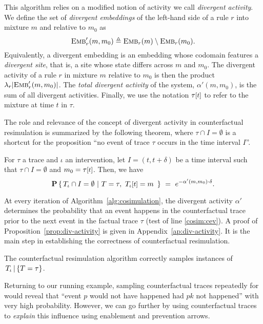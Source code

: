 This algorithm relies on a modified notion of activity we call
\emph{divergent activity}. We define the set of \emph{divergent
  embeddings} of the left-hand side of a rule $r$ into mixture $m$
and relative to $m_0$ as
\[{\textsc{Emb}}'_{r}(m, m_0) \triangleq {\textsc{Emb}}_{r}(m) \setminus {\textsc{Emb}}_{r}(m_0).\]
Equivalently, a divergent embedding is an embedding whose codomain
features a \emph{divergent site}, that is, a site whose state differs
across $m$ and $m_0$. The {divergent activity} of a rule $r$ in
mixture $m$ relative to $m_0$ is then the product
$\lambda_r|{\textsc{Emb}}'_{r}(m, m_0)|$. The \emph{total divergent activity} of
the system, $\alpha'(m, m_0)$, is the sum of all divergent
activities. Finally, we use the notation $\TSTATE{t}{\tau}$ to refer
to the mixture at time $t$ in $\tau$.



The role and relevance of the concept of divergent activity in
counterfactual resimulation is summarized by the
following theorem, where $\tau \cap I = \emptyset$ is a
shortcut for the proposition ``no event of trace $\tau$ occurs in
the time interval $I$''.
\begin{proposition}\label{prop:div-activity}
  For $\tau$ a trace
  and $\iota$ an intervention, let $I = (t, t+\delta)$ be a time interval
  such that $\tau \cap I = \emptyset$ and $m_0 =
  \TSTATE{t}{\tau}$. Then, we have
  \[\CProb{ \ATRAJ{} \cap I = \emptyset }{ T=\tau,\
      \TSTATE{t}{\ATRAJ{}} = m\ }
    \ =\ e^{-\alpha'(m, m_0) \cdot \delta}.
  \]
\end{proposition}
\noindent At every iteration of Algorithm~\ref{alg:cosimulation}, the
divergent activity $\alpha'$ determines the probability that an event
happens in the counterfactual trace prior to the next event in the
factual trace $\tau$ (test of line \ref{cosim:cev}).  A proof of
Proposition~\ref{prop:div-activity} is given in
Appendix~\ref{ap:div-activity}. It is the main step
in establishing the correctness of counterfactual resimulation.

\begin{theorem}%
  The counterfactual resimulation algorithm correctly
  samples instances of $\,{T_\iota\,|\,\{T=\tau\}}{}$.
\end{theorem}

Returning to our running example, sampling counterfactual traces
repeatedly for \RefTrace{} would reveal that ``event $p$ would not
have happened had $pk$ not happened'' with very high probability.
However, we can go further by using counterfactual traces to
\textit{explain} this influence using enablement and prevention
arrows.
